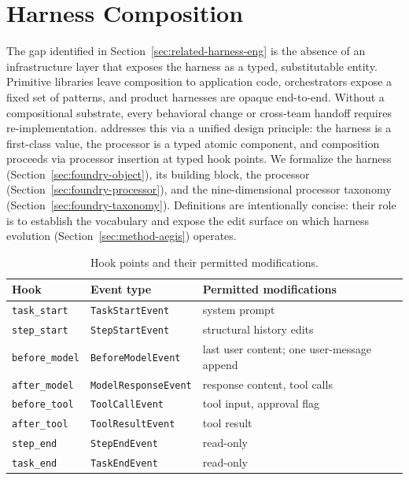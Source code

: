 \section{Harness Composition}
\label{sec:method-foundry}

The gap identified in Section~\ref{sec:related-harness-eng} is the absence of an infrastructure layer that exposes the harness as a typed, substitutable entity. Primitive libraries leave composition to application code, orchestrators expose a fixed set of patterns, and product harnesses are opaque end-to-end. Without a compositional substrate, every behavioral change or cross-team handoff requires re-implementation. \ProjectName addresses this via a unified design principle: the harness is a first-class value, the processor is a typed atomic component, and composition proceeds via processor insertion at typed hook points. We formalize the harness (Section~\ref{sec:foundry-object}), its building block, the processor (Section~\ref{sec:foundry-processor}), and the nine-dimensional processor taxonomy (Section~\ref{sec:foundry-taxonomy}). Definitions are intentionally concise: their role is to establish the vocabulary and expose the edit surface on which harness evolution (Section~\ref{sec:method-aegis}) operates.

\begin{table}[!htbp]
\centering
\small
\begin{tabular}{lll}
\toprule
Hook & Event type & Permitted modifications \\
\midrule
\texttt{task\_start}    & \texttt{TaskStartEvent}     & system prompt \\
\texttt{step\_start}    & \texttt{StepStartEvent}     & structural history edits \\
\texttt{before\_model}  & \texttt{BeforeModelEvent}   & last user content; one user-message append \\
\texttt{after\_model}   & \texttt{ModelResponseEvent} & response content, tool calls \\
\texttt{before\_tool}   & \texttt{ToolCallEvent}      & tool input, approval flag \\
\texttt{after\_tool}    & \texttt{ToolResultEvent}    & tool result \\
\texttt{step\_end}      & \texttt{StepEndEvent}       & read-only \\
\texttt{task\_end}      & \texttt{TaskEndEvent}       & read-only \\
\bottomrule
\end{tabular}
\caption{Hook points and their permitted modifications.}
\label{tab:hook-points}
\end{table}


